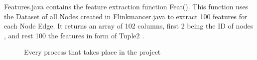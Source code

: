Features.java contains the feature extraction function Feat(). This function uses the Dataset of all Nodes created in Flinkmancer.java to extract 100 features for each Node Edge. It returns an array of 102 columns, first 2 being the ID of nodes , and rest 100 the features in form of Tuple2 .
\begin{figure}[ht]
\noindent{}
\caption{Every process that takes place in the project}
\label{fig:graph}
\end{figure}
